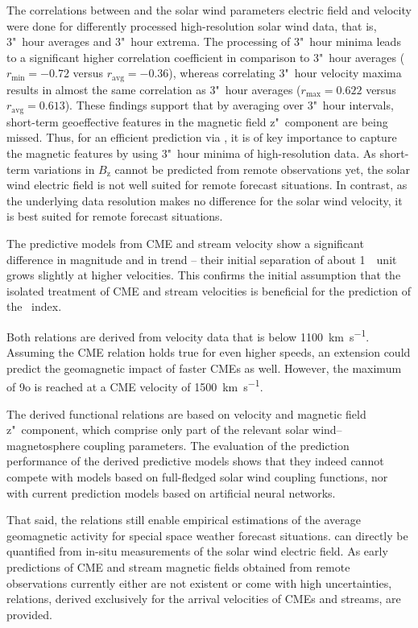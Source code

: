 The correlations between \Kp{} and the solar wind parameters electric field and velocity were done for differently processed high-resolution solar wind data, that is, 3"~hour averages and 3"~hour extrema. The processing of 3"~hour \vBz{} minima leads to a significant higher correlation coefficient in comparison to 3"~hour averages ($r_\text{min} = -0.72$ versus $r_\text{avg} = -0.36$), whereas correlating 3"~hour velocity maxima results in almost the same correlation as 3"~hour averages ($r_\text{max} = 0.622$ versus $r_\text{avg} = 0.613$).
These findings support that by averaging over 3"~hour intervals, short-term geoeffective features in the magnetic field z"~component are being missed. Thus, for an efficient \Kp{} prediction via \vBz{}, it is of key importance to capture the magnetic features by using 3"~hour minima of high-resolution data. As short-term variations in $B_\text{z}$ cannot be predicted from remote observations yet, the solar wind electric field is not well suited for remote forecast situations.
In contrast, as the underlying data resolution makes no difference for the solar wind velocity, it is best suited for remote forecast situations.

The \Kp{} predictive models from CME and stream velocity show a significant difference in magnitude and in trend -- their initial separation of about 1~\Kp~unit grows slightly at higher velocities. This confirms the initial assumption that the isolated treatment of CME and stream velocities is beneficial for the prediction of the \Kp~index.

Both relations are derived from velocity data that is below \SI{1100}{\km\per\s}. Assuming the CME relation holds true for even higher speeds, an extension could predict the geomagnetic impact of faster CMEs as well. However, the maximum \Kp{} of 9o is reached at a CME velocity of \SI{1500}{\km\per\s}.

The derived functional relations are based on velocity and magnetic field z"~component, which comprise only part of the relevant solar wind--magnetosphere coupling parameters. The evaluation of the prediction performance of the derived predictive models shows that they indeed cannot compete with models based on full-fledged solar wind coupling functions, nor with current prediction models based on artificial neural networks.

That said, the relations still enable empirical estimations of the average geomagnetic activity for special space weather forecast situations. \Kp{} can directly be quantified from in-situ measurements of the solar wind electric field. As early predictions of CME and stream magnetic fields obtained from remote observations currently either are not existent or come with high uncertainties, \Kp{} relations, derived exclusively for the arrival velocities of CMEs and streams, are provided.


